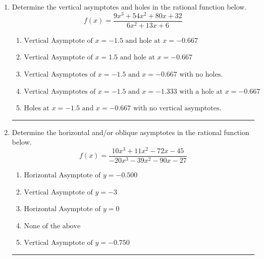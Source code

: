 \documentclass[14pt]{extbook}
\newcommand{\litem}[1]{\item#1\hspace*{-1cm}\rule{\textwidth}{0.4pt}}
\begin{document}
\begin{enumerate}
{\begin{enumerate}[label=\Alph*.]
\end{enumerate} }
\litem{
Determine the vertical asymptotes and holes in the rational function below.\[ f(x) = \frac{9x^{3} +54 x^{2} +80 x + 32}{6x^{2} +13 x + 6} \]\begin{enumerate}[label=\Alph*.]
\item \( \text{Vertical Asymptote of } x = -1.5 \text{ and hole at } x = -0.667 \)
\item \( \text{Vertical Asymptote of } x = 1.5 \text{ and hole at } x = -0.667 \)
\item \( \text{Vertical Asymptotes of } x = -1.5 \text{ and } x = -0.667 \text{ with no holes.} \)
\item \( \text{Vertical Asymptotes of } x = -1.5 \text{ and } x = -1.333 \text{ with a hole at } x = -0.667 \)
\item \( \text{Holes at } x = -1.5 \text{ and } x = -0.667 \text{ with no vertical asymptotes.} \)

\end{enumerate} }
\litem{
Determine the horizontal and/or oblique asymptotes in the rational function below.\[ f(x) = \frac{10x^{3} +11 x^{2} -72 x -45}{-20x^{3} -39 x^{2} -90 x -27} \]\begin{enumerate}[label=\Alph*.]
\item \( \text{Horizontal Asymptote of } y = -0.500  \)
\item \( \text{Vertical Asymptote of } y = -3  \)
\item \( \text{Horizontal Asymptote of } y = 0  \)
\item \( \text{None of the above} \)
\item \( \text{Vertical Asymptote of } y = -0.750  \)

\end{enumerate} }
\end{enumerate}
\end{document}
